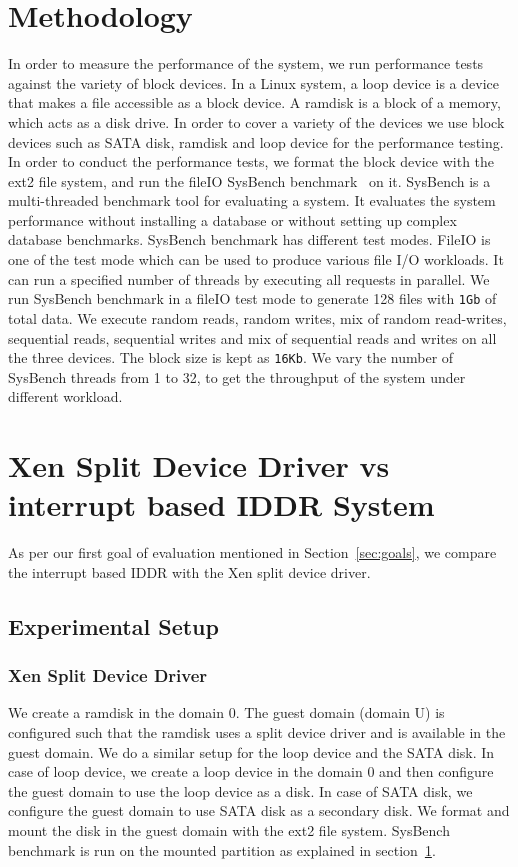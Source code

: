 \section{Methodology}
\label{sec:methodology}
In order to measure the performance of the system, we run performance tests against the variety of block devices. In a Linux system, a loop device is a device that makes a file accessible as a block device. A ramdisk is a block of a memory, which acts as a disk drive. In order to cover a variety of the devices we use block devices such as SATA disk, ramdisk and loop device for the performance testing.
\\[3mm]
In order to conduct the performance tests, we format the block device with the ext2 file system, and run the fileIO SysBench benchmark~\cite{sysbench} on it. SysBench is a multi-threaded benchmark tool for evaluating a system. It evaluates the system performance without installing a database or without setting up complex database benchmarks. SysBench benchmark has different test modes. FileIO is one of the test mode which can be used to produce various file I/O workloads. It can run a specified number of threads by executing all requests in parallel. We run SysBench benchmark in a fileIO test mode to generate 128 files with \texttt{1Gb} of total data. We execute random reads, random writes, mix of random read-writes, sequential reads, sequential writes and mix of sequential reads and writes on all the three devices. The block size is kept as \texttt{16Kb}. We vary the number of SysBench threads from 1 to 32, to get the throughput of the system under different workload. 

\section{Xen Split Device Driver vs interrupt based IDDR System}
As per our first goal of evaluation mentioned in Section~\ref{sec:goals}, we compare the interrupt based IDDR with the Xen split device driver. 

\subsection*{Experimental Setup}

\subsubsection*{Xen Split Device Driver}
We create a ramdisk in the domain 0. The guest domain (domain U) is configured such that the ramdisk uses a split device driver and is available in the guest domain. We do a similar setup for the loop device and the SATA disk. In case of loop device, we create a loop device in the domain 0 and then configure the guest domain to use the loop device as a disk. In case of SATA disk, we configure the guest domain to use SATA disk as a secondary disk. We format and mount the disk in the guest domain with the ext2 file system. SysBench benchmark is run on the mounted partition as explained in section~\ref{sec:methodology}.

